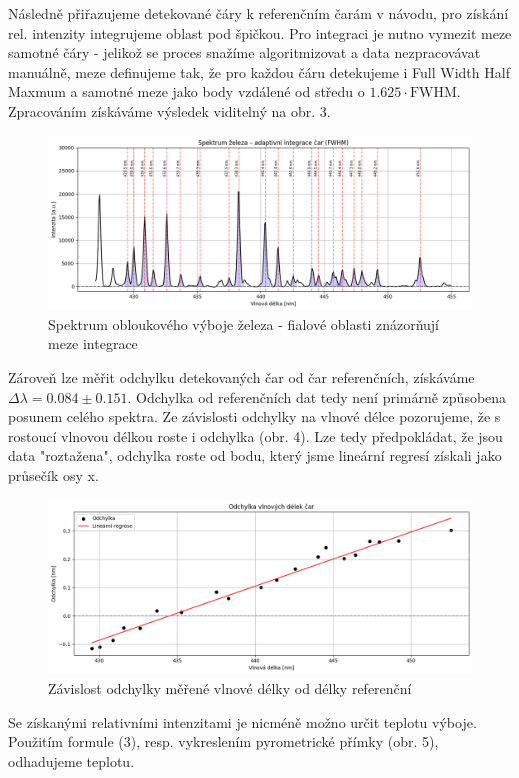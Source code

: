 \documentclass[czech,11pt,a4paper]{article}
\begin{document}
\begin{multicols}{2}
\begin{figure}[H]
		\end{figure}
		
		Následně přiřazujeme detekované čáry k referenčním čarám v návodu, pro získání rel. intenzity integrujeme oblast pod špičkou. Pro integraci je nutno vymezit meze samotné čáry - jelikož se proces snažíme algoritmizovat a data nezpracovávat manuálně, meze definujeme tak, že pro každou čáru detekujeme i Full Width Half Maxmum a samotné meze jako body vzdálené od středu o $1.625\cdot \mathrm{FWHM}$. Zpracováním získáváme výsledek viditelný na obr. 3.
		\begin{figure}[H]
			\centering
			\includegraphics[width=0.9\linewidth]{spectrum3}
			\caption{Spektrum obloukového výboje železa - fialové oblasti znázorňují meze integrace}			
		\end{figure}
		Zároveň lze měřit odchylku detekovaných čar od čar referenčních, získáváme $\Delta \lambda = 0.084\pm 0.151$. Odchylka od referenčních dat tedy není primárně způsobena posunem celého spektra. Ze závislosti odchylky na vlnové délce pozorujeme, že s rostoucí vlnovou délkou roste i odchylka (obr. 4). Lze tedy předpokládat, že jsou data "roztažena", odchylka roste od bodu, který jsme lineární regresí získali jako průsečík osy x.
		\begin{figure}[H]
			\centering
			\includegraphics[width=0.9\linewidth]{zavislost}
			\caption{Závislost odchylky měřené vlnové délky od délky referenční}			
		\end{figure}
		Se získanými relativními intenzitami je nicméně možno určit teplotu výboje. Použitím formule (3), resp. vykreslením pyrometrické přímky (obr. 5), odhadujeme teplotu.

\end{multicols}
\end{document}
